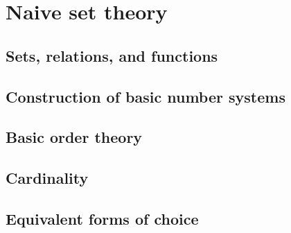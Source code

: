 
\chapter{Naive set theory\label{chap:naiveSetTheory}}

\section{Sets, relations, and functions}

\section{Construction of basic number systems}

\section{Basic order theory}

\section{Cardinality}

\section{Equivalent forms of choice}
